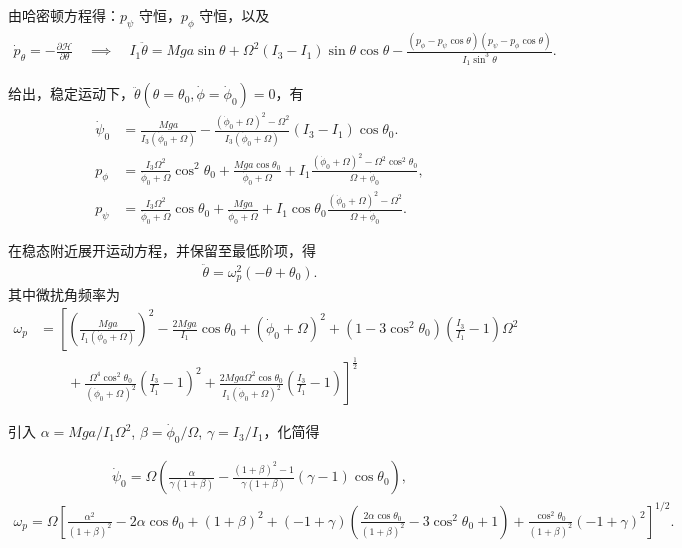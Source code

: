 由哈密顿方程得：\(p_\psi\) 守恒，\(p_\phi\) 守恒，以及
\begin{align*}
	\dot{p}_\theta = -\frac{\partial \mathcal{H}}{\partial \theta}\quad\implies\quad
	I_1 \ddot{\theta} = M g a \sin \theta + \Omega^2 (I_3 - I_1) \sin \theta \cos \theta - \frac{(p_\phi - p_\psi \cos \theta)(p_\psi - p_\phi \cos \theta)}{I_1 \sin^3 \theta}.
\end{align*}

给出，稳定运动下，\(\ddot{\theta} (\theta = \theta_0, \dot{\phi} = \dot{\phi}_0) = 0\)，有
\begin{align*}
	\dot{\psi}_0 & = \frac{M g a}{I_3 (\dot{\phi}_0 + \Omega)} - \frac{(\dot{\phi}_0 + \Omega)^2 - \Omega^2}{I_3 (\dot{\phi}_0 + \Omega)} (I_3 - I_1) \cos \theta_0.                                                        \\
	p_{\phi}     & = \frac{I_3 \Omega^2}{\dot{\phi}_0 + \Omega} \cos^2 \theta_0 + \frac{Mga \cos \theta_0}{\dot{\phi}_0 + \Omega} + I_1 \frac{(\dot{\phi}_0 + \Omega)^2 - \Omega^2 \cos^2 \theta_0}{\Omega + \dot{\phi}_0}, \\
	p_{\psi}     & = \frac{I_3 \Omega^2}{\dot{\phi}_0 + \Omega} \cos \theta_0 + \frac{Mga}{\dot{\phi}_0 + \Omega} + I_1 \cos \theta_0 \frac{(\dot{\phi}_0 + \Omega)^2 - \Omega^2}{\Omega + \dot{\phi}_0}.
\end{align*}

在稳态附近展开运动方程，并保留至最低阶项，得
\begin{align*}
	\ddot{\theta} =\omega_p^2 (-\theta + \theta_0).
\end{align*}
其中微扰角频率为
\begin{align*}
	\omega_p & =\left[ \left( \frac{M g a}{I_1 (\dot{\phi}_0 + \Omega)} \right)^2 - \frac{2 M g a}{I_1} \cos \theta_0 + (\dot{\phi}_0 + \Omega)^2 \right. + (1 - 3 \cos^2 \theta_0) \left( \frac{I_3}{I_1} - 1 \right) \Omega^2 \\&\qquad+ \frac{\Omega^4 \cos^2 \theta_0}{(\dot{\phi}_0 + \Omega)^2} \left( \frac{I_3}{I_1} - 1 \right)^2 + \left. \frac{2 M g a \Omega^2 \cos \theta_0}{I_1 (\dot{\phi}_0 + \Omega)^2} \left( \frac{I_3}{I_1} - 1 \right) \right]^{\frac{1}{2}}
\end{align*}

引入 \(\alpha = M g a/I_1 \Omega^2\), \(\beta = \dot{\phi}_0/\Omega\), \(\gamma = I_3/I_1\)，化简得

\begin{align*}
	\dot{\psi}_0 = \Omega \left( \frac{\alpha}{\gamma (1 + \beta)} - \frac{(1 + \beta)^2 - 1}{\gamma (1 + \beta)} (\gamma - 1) \cos \theta_0 \right),
\end{align*}
\begin{align*}
	\omega_p = \Omega \left[ \frac{\alpha^2}{(1 + \beta)^2} - 2 \alpha \cos \theta_0 + (1 + \beta)^2 \right.+ (-1 + \gamma) \left( \frac{2 \alpha \cos \theta_0}{(1 + \beta)^2} - 3 \cos^2 \theta_0 + 1 \right) + \left. \frac{\cos^2 \theta_0}{(1 + \beta)^2} (-1 + \gamma)^2 \right]^{1/2}.
\end{align*}

